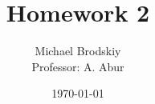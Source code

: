 


\title{Homework 2}
\date{\today}
\author{Michael Brodskiy\\ \small Professor: A. Abur}



\maketitle

